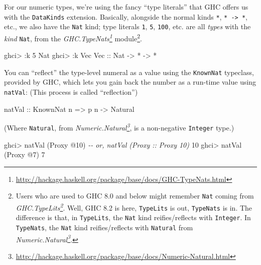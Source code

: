 \documentclass[]{article}
\newenvironment{Shaded}{}{}
\newcommand{\CommentTok}[1]{\textcolor[rgb]{0.38,0.63,0.69}{\textit{#1}}}
\newcommand{\DataTypeTok}[1]{\textcolor[rgb]{0.56,0.13,0.00}{#1}}
\newcommand{\DecValTok}[1]{\textcolor[rgb]{0.25,0.63,0.44}{#1}}
\newcommand{\NormalTok}[1]{#1}
\newcommand{\OperatorTok}[1]{\textcolor[rgb]{0.40,0.40,0.40}{#1}}
\newcommand{\OtherTok}[1]{\textcolor[rgb]{0.00,0.44,0.13}{#1}}
\renewcommand{\href}[2]{#2\footnote{\url{#1}}}
\begin{document}
For our numeric types, we're using the fancy ``type literals'' that GHC offers
us with the \texttt{DataKinds} extension. Basically, alongside the normal kinds
\texttt{*}, \texttt{*\ -\textgreater{}\ *}, etc., we also have the \texttt{Nat}
kind; type literals \texttt{1}, \texttt{5}, \texttt{100}, etc. are all
\emph{types} with the \emph{kind} \texttt{Nat}, from the
\emph{\href{http://hackage.haskell.org/package/base/docs/GHC-TypeNats.html}{GHC.TypeNats}}
module\footnote{Users who are used to GHC 8.0 and below might remember
  \texttt{Nat} coming from
  \emph{\href{http://hackage.haskell.org/package/base/docs/GHC-TypeLits.html}{GHC.TypeLits}}.
  Well, GHC 8.2 is here, \texttt{TypeLits} is out, \texttt{TypeNats} is in. The
  difference is that, in \texttt{TypeLits}, the \texttt{Nat} kind
  reifies/reflects with \texttt{Integer}. In \texttt{TypeNats}, the \texttt{Nat}
  kind reifies/reflects with \texttt{Natural} from
  \emph{\href{http://hackage.haskell.org/package/base/docs/Numeric-Natural.html}{Numeric.Natural}}.}.

\begin{Shaded}
\begin{Highlighting}[]
\NormalTok{ghci}\OperatorTok{>} \OperatorTok{:}\NormalTok{k }\DecValTok{5}
\DataTypeTok{Nat}
\NormalTok{ghci}\OperatorTok{>} \OperatorTok{:}\NormalTok{k }\DataTypeTok{Vec}
\DataTypeTok{Vec}\OtherTok{ ::} \DataTypeTok{Nat} \OtherTok{{-}>} \OperatorTok{*} \OtherTok{{-}>} \OperatorTok{*}
\end{Highlighting}
\end{Shaded}

You can ``reflect'' the type-level numeral as a value using the
\texttt{KnownNat} typeclass, provided by GHC, which lets you gain back the
number as a run-time value using \texttt{natVal}: (This process is called
``reflection'')

\begin{Shaded}
\begin{Highlighting}[]
\OtherTok{natVal ::} \DataTypeTok{KnownNat}\NormalTok{ n }\OtherTok{=>}\NormalTok{ p n }\OtherTok{{-}>} \DataTypeTok{Natural}
\end{Highlighting}
\end{Shaded}

(Where \texttt{Natural}, from
\emph{\href{http://hackage.haskell.org/package/base/docs/Numeric-Natural.html}{Numeric.Natural}},
is a non-negative \texttt{Integer} type.)

\begin{Shaded}
\begin{Highlighting}[]
\NormalTok{ghci}\OperatorTok{>}\NormalTok{ natVal (}\DataTypeTok{Proxy} \OperatorTok{@}\DecValTok{10}\NormalTok{)   }\CommentTok{{-}{-} or, natVal (Proxy :: Proxy 10)}
\DecValTok{10}
\NormalTok{ghci}\OperatorTok{>}\NormalTok{ natVal (}\DataTypeTok{Proxy} \OperatorTok{@}\DecValTok{7}\NormalTok{)}
\DecValTok{7}
\end{Highlighting}
\end{Shaded}
\end{document}

